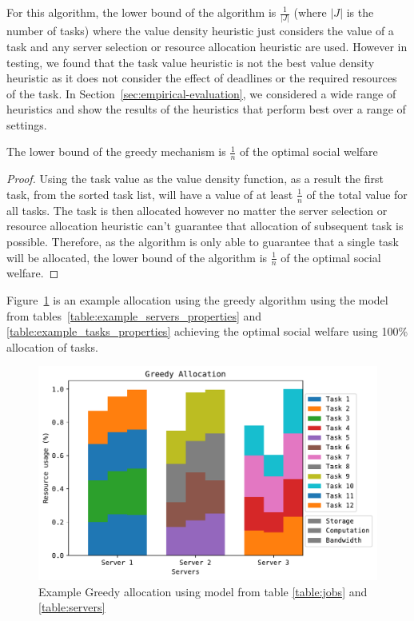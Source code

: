 For this algorithm, the lower bound of the algorithm is $\frac{1}{\left|J\right|}$ (where $\left|J\right|$ is the
number of tasks) where the value density heuristic just considers the value of a task and any server selection or
resource allocation heuristic are used. However in testing, we found that the task value heuristic is not the best
value density heuristic as it does not consider the effect of deadlines or the required resources of the task. In
Section~\ref{sec:empirical-evaluation}, we considered a wide range of heuristics and show the results of the heuristics
that perform best over a range of settings.

\begin{theorem}
    The lower bound of the greedy mechanism is $\frac{1}{n}$ of the optimal social welfare
\end{theorem}
\begin{proof}
    Using the task value as the value density function, as a result the first task, from the sorted task list, will
    have a value of at least $\frac{1}{n}$ of the total value for all tasks. The task is then allocated however no
    matter the server selection or resource allocation heuristic can't guarantee that allocation of subsequent task is
    possible. Therefore, as the algorithm is only able to guarantee that a single task will be allocated, the lower
    bound of the algorithm is $\frac{1}{n}$ of the optimal social welfare.
\end{proof}

Figure~\ref{fig:greedy_allocation} is an example allocation using the greedy algorithm using the model from
tables~\ref{table:example_servers_properties} and \ref{table:example_tasks_properties} achieving the optimal social
welfare using 100\% allocation of tasks. %
\begin{figure}[H]
    \includegraphics[width=\linewidth]{fig/allocation/greedy_allocation.pdf}
    \caption{Example Greedy allocation using model from table \ref{table:jobs} and \ref{table:servers}}
    \label{fig:greedy_allocation}
\end{figure}

